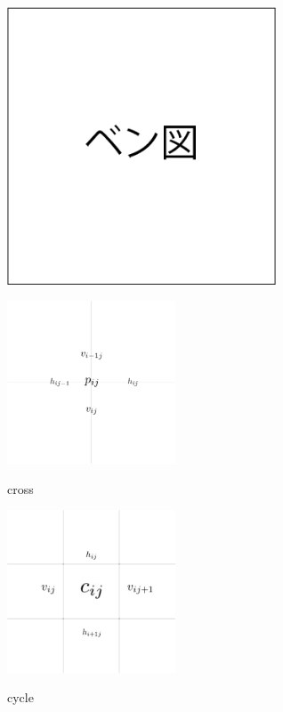 \begin{clearpagefigure}
  \includegraphics[width=8cm,clip]{fig/vennDiagram.png}
  \caption{}
  \label{figure:VennDiagram}
\end{clearpagefigure}

\begin{clearpagefigure}
  \includegraphics[width=5cm]{fig/cross.png}
  \caption{cross}
  \label{figure:cross}
\end{clearpagefigure}

\begin{clearpagefigure}
  \includegraphics[width=5cm]{fig/cycle.png}
  \caption{cycle}
  \label{figure:cycle}
\end{clearpagefigure}
